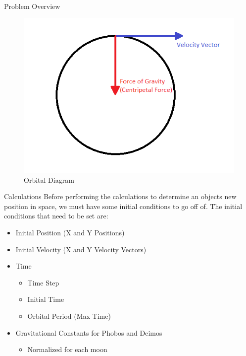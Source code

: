 \documentclass{beamer}  %
\begin{document}
\begin{frame}{Problem Overview}

\begin{figure}
\label{fig:1}
\includegraphics[scale=0.5]{orbitalDiagram}
\caption{Orbital Diagram}
\end{figure}

\end{frame}

\begin{frame}{Calculations}
Before performing the calculations to determine an objects new position in space, we must have some initial conditions to go off of. The initial conditions that need to be set are:

\begin{itemize}

\item Initial Position (X and Y Positions)
\item Initial Velocity (X and Y Velocity Vectors)

\item Time
\begin{itemize}
\item Time Step
\item Initial Time
\item Orbital Period (Max Time)
\end{itemize}

\item Gravitational Constants for Phobos and Deimos
\begin{itemize}
\item Normalized for each moon
\end{itemize}

\end{itemize}



\end{frame}
\end{document}
